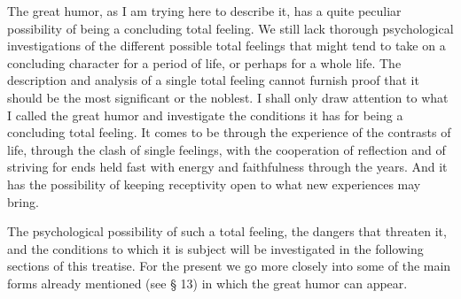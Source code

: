 \documentclass[12pt]{book}
\begin{document}
The great humor, as I am trying here to describe it, has a quite peculiar possibility
of being a concluding total feeling. We still lack thorough psychological
investigations of the different possible total feelings that might tend to take on a
concluding character for a period of life, or perhaps for a whole life. The
description and analysis of a single total feeling cannot furnish proof that it should
be the most significant or the noblest. I shall only draw attention to what I called
the great humor and investigate the conditions it has for being a concluding total
feeling. It comes to be through the experience of the contrasts of life, through the
clash of single feelings, with the cooperation of reflection and of striving for ends
held fast with energy and faithfulness through the years. And it has the possibility
of keeping receptivity open to what new experiences may bring.

The psychological possibility of such a total feeling, the dangers that threaten it,
and the conditions to which it is subject will be investigated in the following
sections of this treatise. For the present we go more closely into some of the main
forms already mentioned (see § 13) in which the great humor can appear.
\end{document}
